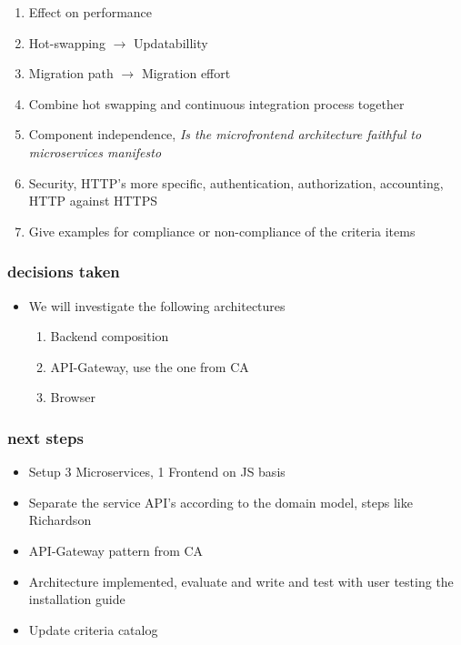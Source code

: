 \documentclass{article}
\begin{document}
\begin{itemize}
        \begin{enumerate}
            \item Effect on performance
            \item Hot-swapping \( \rightarrow \) Updatabillity
            \item Migration path \( \rightarrow \) Migration effort
            \item Combine hot swapping and continuous integration process together
            \item Component independence, \textit{Is the microfrontend architecture faithful to microservices manifesto}
            \item Security, HTTP's more specific, authentication, authorization, accounting, HTTP against HTTPS 
            \item Give examples for compliance or non-compliance of the criteria items
        \end{enumerate}
\end{itemize}

\subsubsection{decisions taken}
\begin{itemize}
    \item We will investigate the following architectures
        \begin{enumerate}
            \item Backend composition
            \item API-Gateway, use the one from CA
            \item Browser
        \end{enumerate}
\end{itemize}

\subsubsection{next steps}
\begin{itemize}
    \item Setup 3 Microservices, 1 Frontend on JS basis
    \item Separate the service API's according to the domain model, steps like Richardson
    \item API-Gateway pattern from CA
    \item Architecture implemented, evaluate and write and test with user testing the installation guide
    \item Update criteria catalog
\end{itemize}
\end{document}
